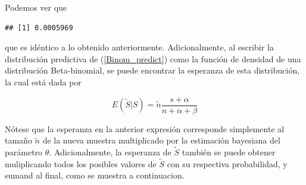 \begin{knitrout}
\color{fgcolor}\begin{kframe}
\begin{alltt}
\hlkwb{<-}\hlopt{+}\hlopt{/}\hlopt{+}\hlopt{+}
\hlkwb{<-}\hlopt{/}\hlstd{(}\hlopt{+}\hlopt{+}\hlopt{+}
\hlkwb{<-}\hlstd{(}\hlstd{,(}\hlopt{+}
  \hlopt{:}
\hlkwb{<-}\hlopt{-}\hlstd{,}
\hlstd{\}}
\end{alltt}
\end{kframe}
\end{knitrout}
    
    Podemos ver que
\begin{knitrout}
\color{fgcolor}\begin{kframe}
\begin{alltt}
\hlstd{res2[}\hlstd{]}
\end{alltt}
\begin{verbatim}
## [1] 0.0005969
\end{verbatim}
\end{kframe}
\end{knitrout}
    que es id\'entico a lo obtenido anteriormente. Adicionalmente, al escribir la distribuci\'on predictiva de (\ref{Binom_predict}) como la funci\'on de densidad de una distribuci\'on Beta-binomial, se puede encontrar la esperanza de esta distribuci\'on, la cual est\'a dada por
    
    \begin{equation*}
    E(\tilde{S}|S)=\tilde{n}\frac{s+\alpha}{n+\alpha+\beta}
    \end{equation*}
    
    N\'otese que la esperanza en la anterior expresi\'on corresponde simplemente al tama\~no $\tilde{n}$ de la nueva muestra multiplicado por la estimaci\'on bayesiana del par\'ametro $\theta$. Adicionalmente, la esperanza de $\tilde{S}$ tambi\'en se puede obtener muliplicando todos los posibles valores de $\tilde{S}$ con su respectiva probabilidad, y sumand al final, como se muestra a continuacion.
    
